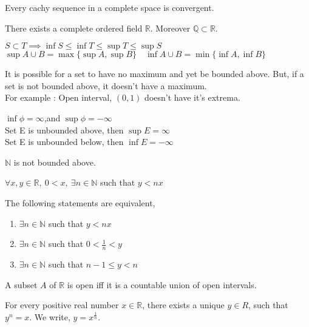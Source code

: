 	\begin{remark}
		Every cachy sequence in a complete space is convergent.
	\end{remark}
	\begin{theorem}
		There exists a complete ordered field $\mathbb{R}$. Moreover $\mathbb{Q} \subset \mathbb{R}$.
	\end{theorem}
	\begin{remark}
		$S\subset T \implies \inf S \le \inf T \le \sup T \le \sup S$\\
		$\sup A \cup B = \max\{\sup A,\sup B\} \quad \inf A\cup B = \min\{\inf A,\inf B\}$
	\end{remark}
	\begin{remark}
		It is possible for a set to have no maximum and yet be bounded above. But, if a set is not bounded above, it doesn't have a maximum.\\
		For example : Open interval, $(0,1)$ doesn't have it's extrema.
	\end{remark}
	\begin{remark}
		$\inf \phi = \infty$,and $\sup \phi = -\infty$\\
		Set E is unbounded above, then $\sup E = \infty$\\
		Set E is unbounded below, then $\inf E = -\infty$
	\end{remark}
	\begin{theorem}
		$\mathbb{N}$ is not bounded above.
	\end{theorem}
	\begin{theorem}[Archimedean]
		$\forall x,y \in \mathbb{R},\ 0<x,\ \exists n \in \mathbb{N}$ such that $y < nx$
	\end{theorem}
	\begin{remark} The following statements are equivalent,
		\begin{enumerate}
			\item $\exists n \in \mathbb{N}$ such that $y < nx$
			\item $\exists n \in \mathbb{N}$ such that $0 < \frac{1}{n} < y$
			\item $\exists n \in \mathbb{N}$ such that $n-1 \le y < n$
		\end{enumerate}
	\end{remark}
	\begin{theorem}
		A subset $A$ of $\mathbb{R}$ is open iff it is a countable union of open intervals.
	\end{theorem}
	\begin{theorem}
		For every positive real number $x \in \mathbb{R}$, there exists a unique $y \in R$,
		such that $y^n = x$. We write, $y = x^\frac{1}{n}$.
	\end{theorem}
